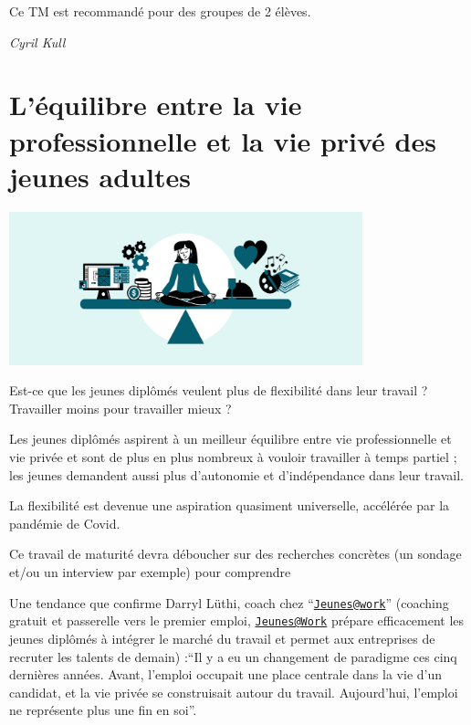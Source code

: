 \documentclass[
  10pt,
  french,
  a5paper,
  openany]{book}
\newenvironment{signature}{\begin{flushright}}{\end{flushright}}
\begin{document}
Ce TM est recommandé pour des groupes de 2 élèves.

\begin{signature}
\emph{Cyril Kull}

\end{signature}

\hypertarget{luxe9quilibre-entre-la-vie-professionnelle-et-la-vie-privuxe9-des-jeunes-adultes}{%
\chapter{\texorpdfstring{L'équilibre entre la vie professionnelle \linebreak et la vie privé des jeunes adultes}{L'équilibre entre la vie professionnelle et la vie privé des jeunes adultes}}\label{luxe9quilibre-entre-la-vie-professionnelle-et-la-vie-privuxe9-des-jeunes-adultes}}

\begin{center}
\includegraphics[width=\textwidth,height=12em]{images/equilibre-vie-professionnelle-prive-jeunes-adultes.jpg}

\end{center}

Est-ce que les jeunes diplômés veulent plus de flexibilité dans leur travail ? Travailler moins pour travailler mieux ?

Les jeunes diplômés aspirent à un meilleur équilibre entre vie professionnelle et vie privée et sont de plus en plus nombreux à vouloir travailler à temps partiel ; les jeunes demandent aussi plus d'autonomie et d'indépendance dans leur travail.

La flexibilité est devenue une aspiration quasiment universelle, accélérée par la pandémie de Covid.

Ce travail de maturité devra déboucher sur des recherches concrètes (un sondage et/ou un interview par exemple) pour comprendre

Une tendance que confirme Darryl Lüthi, coach chez ``\href{mailto:Jeunes@work}{\nolinkurl{Jeunes@work}}'' (coaching gratuit et passerelle vers le premier emploi, \href{mailto:Jeunes@Work}{\nolinkurl{Jeunes@Work}} prépare efficacement les jeunes diplômés à intégrer le marché du travail et permet aux entreprises de recruter les talents de demain) :``Il y a eu un changement de paradigme ces cinq dernières années. Avant, l'emploi occupait une place centrale dans la vie d'un candidat, et la vie privée se construisait autour du travail. Aujourd'hui, l'emploi ne représente plus une fin en soi''.
\end{document}
